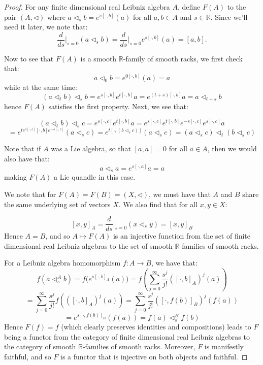 \documentclass[12pt]{amsart}
\theoremstyle{plain}
\theoremstyle{definition}
\begin{document}
\begin{proof}
 For any finite dimensional real Leibniz algebra $A$, define $F(A)$ to the pair $(A,\triangleleft)$ where $a\triangleleft_s b = e^{s [\cdot,b]}(a)$ for all $a,b \in A$ and $s \in \mathbb{R}$. Since we'll need it later, we note that: $$ \frac{d}{ds}\bigg|_{s=0} (a\triangleleft_s b) = \frac{d}{ds}\bigg|_{s=0} e^{s [\cdot,b]}(a) = [a,b].$$

Now to see that $F(A)$ is a smooth $\mathbb{R}$-family of smooth racks, we first check that:
$$  a\triangleleft_0 b = e^{0 [\cdot,b]}(a) = a  $$
while at the same time:
$$ (a \triangleleft_t b ) \triangleleft_s b  = e^{s [\cdot,b]}e^{t [\cdot,b]}a = e^{(t+s) [\cdot,b]}a = a \triangleleft_{t+s}b$$
hence $F(A)$ satisfies the first property. Next, we see that:

$$ (a \triangleleft_t b ) \triangleleft_s c =e^{s [\cdot,c]}e^{t [\cdot,b]}a=e^{s [\cdot,c]}e^{t [\cdot,b]}e^{-s [\cdot,c]}e^{s [\cdot,c]}a $$ $$=e^{t e^{s [\cdot,c]}[\cdot,b]e^{-s [\cdot,c]}} (a\triangleleft_s c) =e^{t [\cdot,(b\triangleleft_s c)]} (a\triangleleft_s c) =(a\triangleleft_s c) \triangleleft_t (b\triangleleft_s c) $$

Note that if $A$ was a Lie algebra, so that $[a,a]=0$ for all $a \in A$, then we would also have that:
$$ a \triangleleft_s a = e^{s[\cdot,a]}a = a  $$
making $F(A)$ a Lie quandle in this case.


We note that for $F(A)=F(B) =(X,\triangleleft)$, we must have that $A$ and $B$ share the same underlying set of vectors $X$. We also find that for all $x,y \in X$:

$$ [x,y]_A = \frac{d}{ds}\bigg|_{s=0} (x \triangleleft_s y) =   [x,y]_B$$
Hence $A=B$, and so $A \mapsto F(A)$ is an injective function from the set of finite dimensional real Leibniz algebras to the set of smooth $\mathbb{R}$-families of smooth racks. 

 For a Leibniz algebra homomorphism $f:A \to B$, we have that:
$$ f(a\triangleleft^A_s b) = f\big(  e^{s  [\cdot,b]_A}(a)\big)= f\left(  \sum_{j=0}^{\infty} \frac{s^j}{j!} ([\cdot,b]_A)^j(a)\right)$$
$$=  \sum_{j=0}^{\infty} \frac{s^j}{j!} f\left(  ([\cdot,b]_A)^j(a)\right)=  \sum_{j=0}^{\infty} \frac{s^j}{j!}   ([\cdot,f(b)]_B)^j(f(a)) $$ $$=  e^{s [\cdot,f(b)]_B}(f(a)) = f(a)\triangleleft^B_sf(b) $$
Hence $F(f)=f$ (which clearly preserves identities and compositions) leads to $F$ being a functor from the category of finite dimensional real Leibniz algebras to the category of smooth $\mathbb{R}$-families of smooth racks. Moreover, $F$ is manifestly faithful, and so $F$ is a functor that is injective on both objects and faithful.
\end{proof}
\end{document}
